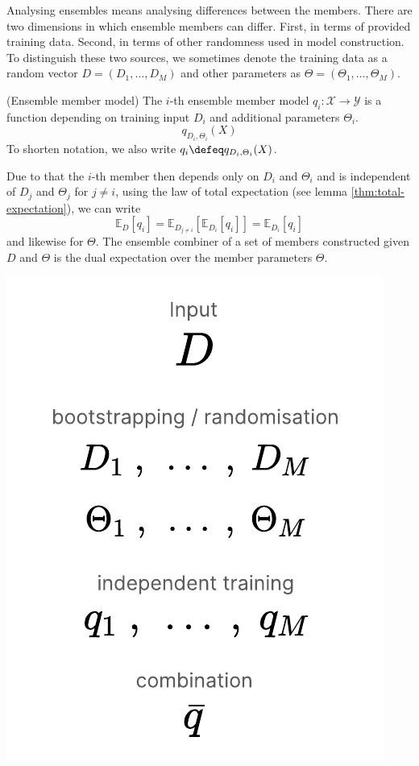 \documentclass[
    a4paper, %
	fontsize=10pt, %
	twoside=false, %
]{kaobook}
\begin{document}
\begin{titlepage}
Analysing ensembles means analysing differences between the members. There are two dimensions in which ensemble members can differ. First, in terms of provided training data. 
Second, in terms of other randomness used in model construction.
To distinguish these two sources, we sometimes denote the training data as a random vector $D = (D_{1}, \dots, D_{M})$ and other parameters as $\Theta = (\Theta_{1}, \dots, \Theta_{M})$. 
\begin{definition} (Ensemble member model) The $i$-th ensemble member model $q_{i}: \mathcal{X} \to \mathcal{Y}$ is a function depending on training input $D_{i}$ and additional parameters $\Theta_{i}$.
$$
q_{D_{i}, \Theta_{i}}(X)
$$
To shorten notation, we also write $q_{i} \defeq  q_{D_{i}, \Theta_{i}}(X)$.
\end{definition}
Due to that the $i$-th member then depends only on $D_{i}$ and $\Theta_{i}$ and is independent of $D_{j}$ and $\Theta_{j}$ for $j \not= i$, using the law of total expectation (see lemma \ref{thm:total-expectation}), we can write
$$
\mathbb{E}_{D}\left[ q_{i} \right] = \mathbb{E}_{D_{j \not= i}}\left[ \mathbb{E}_{D_{i}}\left[ q_{i} \right]   \right]  = \mathbb{E}_{D_{i}}\left[ q_{i} \right] 
$$
and likewise for $\Theta$. 
The ensemble combiner of a set of members constructed given $D$ and $\Theta$ is the dual expectation over the member parameters $\Theta$.
\begin{marginfigure}
  \includegraphics[width=\textwidth]{figma-illustrations/ensemble-learning.pdf}

\end{marginfigure}
\end{titlepage}
\end{document}
